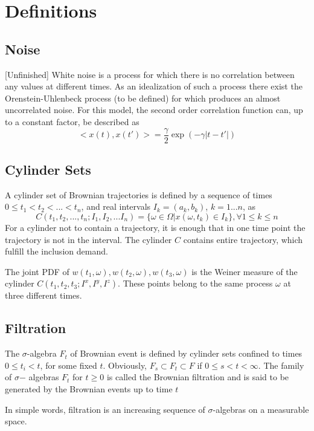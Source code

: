 \documentclass[12pt]{paper}
\begin{document}
\tableofcontents
\section{Definitions}
\subsection{Noise}[Unfinished]
White noise is a process for which there is no correlation between any values at different times. As an idealization of such a process there exist the Orenstein-Uhlenbeck process (to be defined) for which produces an almost uncorrelated noise. For this model, the second order correlation function can, up to a constant factor, be described as 
\begin{equation*}
<x(t),x(t')>= \frac{\gamma}{2}\exp(-\gamma|t-t'|)
\end{equation*}

\subsection{Cylinder Sets}
A cylinder set of Brownian trajectories is defined by a sequence of times $0\leq t_1<t_2<...<t_n$, and real intervals $I_k=(a_k,b_k)$, $k=1...n$, as 
\begin{equation*}
C(t_1,t_2,...,t_n;I_1,I_2,...I_n)=\{\omega\in \Omega|x(\omega,t_k)\in I_k\},\forall 1\leq k \leq n
\end{equation*}
For a cylinder not to contain a trajectory, it is enough that in one time point the trajectory is not in the interval.
The cylinder $C$ contains entire trajectory, which fulfill the inclusion demand. 

The joint PDF of $w(t_1,\omega),w(t_2,\omega),w(t_3,\omega)$ is the Weiner measure of the cylinder $C(t_1,t_2,t_3;I^x,I^y,I^z)$. These points belong to the same process $\omega$ at three different times. 

\subsection{Filtration}
The $\sigma$-algebra $F_t$ of Brownian event is defined by cylinder
sets confined to times $0\leq t_i < t$, for some fixed $t$. Obviously, $F_s \subset F_t \subset F$ if $0\leq s < t <\infty$. The family of $\sigma$− algebras $F_t$ for $t \geq 0$ is called the Brownian filtration and is said to be generated by the Brownian events up to time $t$

In simple words, filtration is an increasing sequence of $\sigma$-algebras on a measurable space. 
\end{document}
